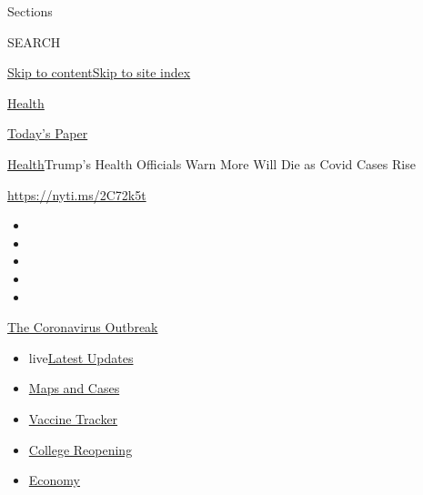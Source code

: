 Sections

SEARCH

\protect\hyperlink{site-content}{Skip to
content}\protect\hyperlink{site-index}{Skip to site index}

\href{https://www.nytimes3xbfgragh.onion/section/health}{Health}

\href{https://myaccount.nytimes3xbfgragh.onion/auth/login?response_type=cookie\&client_id=vi}{}

\href{https://www.nytimes3xbfgragh.onion/section/todayspaper}{Today's
Paper}

\href{/section/health}{Health}\textbar{}Trump's Health Officials Warn
More Will Die as Covid Cases Rise

\url{https://nyti.ms/2C72k5t}

\begin{itemize}
\item
\item
\item
\item
\item
\end{itemize}

\href{https://www.nytimes3xbfgragh.onion/news-event/coronavirus?action=click\&pgtype=Article\&state=default\&region=TOP_BANNER\&context=storylines_menu}{The
Coronavirus Outbreak}

\begin{itemize}
\tightlist
\item
  live\href{https://www.nytimes3xbfgragh.onion/2020/08/04/world/coronavirus-covid-19.html?action=click\&pgtype=Article\&state=default\&region=TOP_BANNER\&context=storylines_menu}{Latest
  Updates}
\item
  \href{https://www.nytimes3xbfgragh.onion/interactive/2020/us/coronavirus-us-cases.html?action=click\&pgtype=Article\&state=default\&region=TOP_BANNER\&context=storylines_menu}{Maps
  and Cases}
\item
  \href{https://www.nytimes3xbfgragh.onion/interactive/2020/science/coronavirus-vaccine-tracker.html?action=click\&pgtype=Article\&state=default\&region=TOP_BANNER\&context=storylines_menu}{Vaccine
  Tracker}
\item
  \href{https://www.nytimes3xbfgragh.onion/2020/08/02/us/covid-college-reopening.html?action=click\&pgtype=Article\&state=default\&region=TOP_BANNER\&context=storylines_menu}{College
  Reopening}
\item
  \href{https://www.nytimes3xbfgragh.onion/live/2020/08/03/business/stock-market-today-coronavirus?action=click\&pgtype=Article\&state=default\&region=TOP_BANNER\&context=storylines_menu}{Economy}
\end{itemize}

